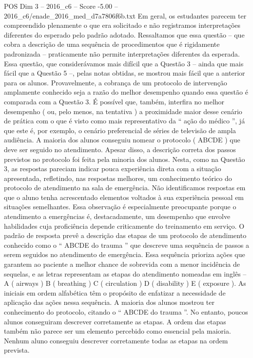\begin{textsample}{POS Dim 3 – 2016\_c6 – Score -5.00 – 2016\_c6/enade\_2016\_med\_d7a7806f6b.txt}
Em geral, os estudantes parecem ter compreendido plenamente o que era solicitado e não registramos interpretações diferentes do esperado pelo padrão adotado.
Ressaltamos que essa questão – que cobra a descrição de uma sequência de procedimentos que é rigidamente padronizada – praticamente não permite interpretações diferentes da esperada.
Essa questão, que considerávamos mais difícil que a Questão 3 – ainda que mais fácil que a Questão 5 –, pelas notas obtidas, se mostrou mais fácil que a anterior para os alunos.
Provavelmente, a cobrança de um protocolo de intervenção amplamente conhecido seja a razão do melhor desempenho quando essa questão é comparada com a Questão 3.
É possível que, também, interfira no melhor desempenho ( ou, pelo menos, na tentativa ) a proximidade maior desse cenário de prática com o que é visto como mais representativo da “ ação do médico ”, já que este é, por exemplo, o cenário preferencial de séries de televisão de ampla audiência.
A maioria dos alunos conseguiu nomear o protocolo ( ABCDE ) que deve ser seguido no atendimento.
Apesar disso, a descrição correta dos passos previstos no protocolo foi feita pela minoria dos alunos.
Nesta, como na Questão 3, as respostas pareciam indicar pouca experiência direta com a situação apresentada, refletindo, nas respostas melhores, um conhecimento teórico do protocolo de atendimento na sala de emergência.
Não identificamos respostas em que o aluno tenha acrescentado elementos voltados à sua experiência pessoal em situações semelhantes.
Essa observação é especialmente preocupante porque o atendimento a emergências é, destacadamente, um desempenho que envolve habilidades cuja proficiência depende criticamente do treinamento em serviço.
O padrão de resposta prevê a descrição das etapas de um protocolo de atendimento conhecido como o “ ABCDE do trauma ” que descreve uma sequência de passos a serem seguidos no atendimento de emergência.
Essa sequência prioriza ações que garantem ao paciente a melhor chance de sobrevida com a menor incidência de sequelas, e as letras representam as etapas do atendimento nomeadas em inglês – A ( airways ) B ( breathing ) C ( circulation ) D ( disability ) E ( exposure ).
As iniciais em ordem alfabética têm o propósito de enfatizar a necessidade de aplicação das ações nessa sequência.
A maioria dos alunos mostrou ter conhecimento do protocolo, citando o “ ABCDE do trauma ”.
No entanto, poucos alunos conseguiram descrever corretamente as etapas.
A ordem das etapas também não parece ser um elemento percebido como essencial pela maioria.
Nenhum aluno conseguiu descrever corretamente todas as etapas na ordem prevista.

\end{textsample}
